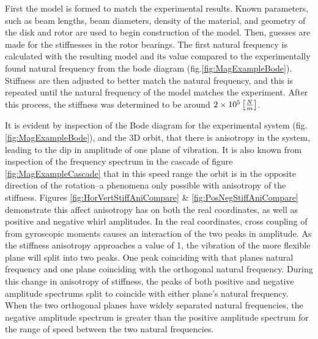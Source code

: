 First the model is formed to match the experimental results. Known parameters, such as beam lengths, beam diameters, density of the material, and geometry of the disk and rotor are used to begin construction of the model. Then, guesses are made for the stiffnesses in the rotor bearings. The first natural frequency is calculated with the resulting model and its value compared to the experimentally found natural frequency from the bode diagram (fig.\ref{fig:MagExampleBode}). Stiffness are then adjusted to better match the natural frequency, and this is repeated until the natural frequency of the model matches the experiment. After this process, the stiffness was determined to be around $ 2\times 10^{5} \left[\frac{N}{m}\right]$.\par
It is evident by inspection of the Bode diagram for the experimental system (fig.\ref{fig:MagExampleBode}), and the 3D orbit, that there is anisotropy in the system, leading to the dip in amplitude of one plane of vibration. It is also known from inspection of the frequency spectrum in the cascade of figure \ref{fig:MagExampleCascade} that in this speed range the orbit is in the opposite direction of the rotation--a phenomena only possible with anisotropy of the stiffness. Figures \ref{fig:HorVertStiffAniCompare} \& \ref{fig:PosNegStiffAniCompare} demonstrate this affect anisotropy has on both the real coordinates, as well as positive and negative whirl amplitudes. In the real coordinates, cross coupling of from gyroscopic moments causes an interaction of the two peaks in amplitude. As the stiffness anisotropy approaches a value of 1, the vibration of the more flexible plane will split into two peaks. One peak coinciding with that planes natural frequency and one plane coinciding with the orthogonal natural frequency. During this change in anisotropy of stiffness, the peaks of both positive and negative amplitude spectrums split to coincide with either plane's natural frequency. When the two orthogonal planes have widely separated natural frequencies, the negative amplitude spectrum is greater than the positive amplitude spectrum for the range of speed between the two natural frequencies. \par 
